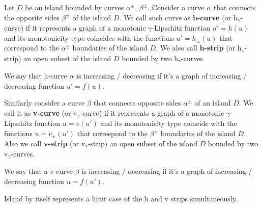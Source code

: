 \begin{definition}
	Let $D$ be an island bounded by curves $\alpha^{\pm}$, $\beta^{\pm}$.
	Consider a curve $\alpha$ that connects the opposite sides $\beta^{\pm}$ of the island $D$. 
	We call such curve as {\bf h-curve} (or $\mathrm{h}_{\gamma}$-curve) if it represents a graph of a monotonic $\gamma$-Lipschitz function $u' = h(u)$ and its monotonicity type coincides with the functions $u' = h_{\pm}(u)$ that correspond to the $\alpha^{\pm}$ boundaries of the island $D$.
	We also call {\bf h-strip} (or $\mathrm{h}_{\gamma}$-strip) an open subset of the island $D$ bounded by two $\mathrm{h}_{\gamma}$-curves.
\end{definition}

\begin{remark}
	We say that h-curve $\alpha$ is increasing / decreasing if it's a graph of increasing / decreasing function $u' = f(u)$.
\end{remark}

\begin{definition}
	Similarly consider a curve $\beta$ that connects opposite sides $\alpha^{\pm}$ of an island $D$.
	We call it as {\bf v-curve} (or $\mathrm{v}_{\gamma}$-curve) if it represents a graph of a monotonic $\gamma$-Lipschitz function $u = v(u')$ and its monotonicity type coincide with the functions $u = v_{\pm}(u')$ that correspond to the $\beta^{\pm}$ boundaries of the island $D$.
	Also we call {\bf v-strip} (or $\mathrm{v}_{\gamma}$-strip) an open subset of the island $D$ bounded by two $\mathrm{v}_{\gamma}$-curves.
\end{definition}

\begin{remark}
	We say that a v-curve $\beta$ is increasing / decreasing if it's a graph of increasing / decreasing function $u = f(u')$.
\end{remark}

\begin{remark}
	Island by itself represents a limit case of the h and v strips simultaneously.
\end{remark}

